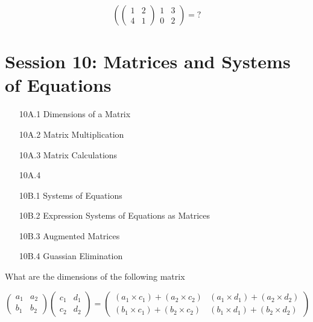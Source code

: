 \[ \left(
\left(
\begin{array}{cc}
1 & 2 \\ 
4 & 1
\end{array} \right)
\begin{array}{cc}
1 & 3 \\ 
0 & 2
\end{array} \right) = ? \]

\newpage
\section*{Session 10: Matrices and Systems of Equations}
\begin{itemize}
\item[10A.1] Dimensions of a Matrix
\item[10A.2] Matrix Multiplication
\item[10A.3] Matrix Calculations
\item[10A.4] 
\end{itemize}

\begin{itemize}
\item[10B.1] Systems of Equations
\item[10B.2] Expression Systems of Equations as Matrices
\item[10B.3] Augmented Matrices
\item[10B.4] Guassian Elimination
\end{itemize}



What are the dimensions of the following matrix


\[ \left(
\begin{array}{cc}
a_1 & a_2 \\ 
b_1 & b_2
\end{array} \right)\left(
\begin{array}{cc}
c_1 & d_1 \\ 
c_2 & d_2
\end{array} \right) = \left(
\begin{array}{cc}
(a_1 \times c_1) + (a_2 \times c_2) & (a_1 \times d_1) + (a_2 \times d_2) \\ 
(b_1 \times c_1) + (b_2 \times c_2) & (b_1 \times d_1) + (b_2 \times d_2)
\end{array} \right) \]

